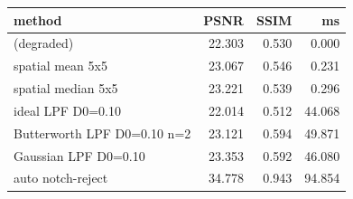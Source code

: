 \begin{tabular}{lrrr}
\toprule
method & PSNR & SSIM & ms \\
\midrule
(degraded) & 22.303 & 0.530 & 0.000 \\
spatial mean 5x5 & 23.067 & 0.546 & 0.231 \\
spatial median 5x5 & 23.221 & 0.539 & 0.296 \\
ideal LPF D0=0.10 & 22.014 & 0.512 & 44.068 \\
Butterworth LPF D0=0.10 n=2 & 23.121 & 0.594 & 49.871 \\
Gaussian LPF D0=0.10 & 23.353 & 0.592 & 46.080 \\
auto notch-reject & 34.778 & 0.943 & 94.854 \\
\bottomrule
\end{tabular}

